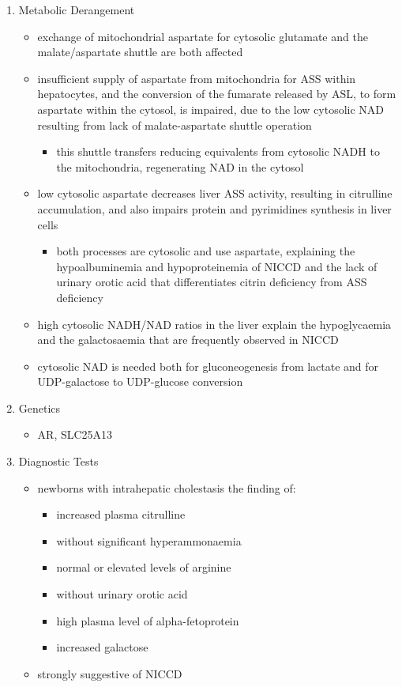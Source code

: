\documentclass{scrartcl}
\begin{document}
\begin{enumerate}
\item Metabolic Derangement
\label{sec:org99ca45f}
\begin{itemize}
\item exchange of mitochondrial aspartate for cytosolic glutamate and
the malate/aspartate shuttle are both affected
\item insufficient supply of aspartate from mitochondria for ASS within
hepatocytes, and the conversion of the fumarate released by ASL, to
form aspartate within the cytosol, is impaired, due to the low
cytosolic NAD resulting from lack of malate-aspartate shuttle
operation
\begin{itemize}
\item this shuttle transfers reducing equivalents from cytosolic NADH
to the mitochondria, regenerating NAD in the cytosol
\end{itemize}
\item low cytosolic aspartate decreases liver ASS activity, resulting in
citrulline accumulation, and also impairs protein and pyrimidines
synthesis in liver cells
\begin{itemize}
\item both processes are cytosolic and use aspartate, explaining the
hypoalbuminemia and hypoproteinemia of NICCD and the lack of
urinary orotic acid that differentiates citrin deficiency from
ASS deficiency
\end{itemize}
\item high cytosolic NADH/NAD ratios in the liver explain the
hypoglycaemia and the galactosaemia that are frequently observed in
NICCD
\item cytosolic NAD is needed both for gluconeogenesis from lactate and
for UDP-galactose to UDP-glucose conversion
\end{itemize}

\item Genetics
\label{sec:org3261b9f}
\begin{itemize}
\item AR, SLC25A13
\end{itemize}

\item Diagnostic Tests
\label{sec:orgee115e6}
\begin{itemize}
\item newborns with intrahepatic cholestasis the finding of:
\begin{itemize}
\item increased plasma citrulline
\item without significant hyperammonaemia
\item normal or elevated levels of arginine
\item without urinary orotic acid
\item high plasma level of alpha-fetoprotein
\item \textpm{} increased galactose
\end{itemize}
\item strongly suggestive of  NICCD
\end{itemize}


\end{enumerate}
\end{document}
